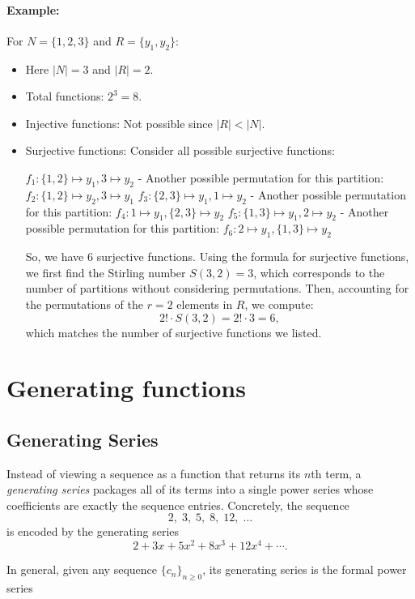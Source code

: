 \documentclass{article}
\begin{document}
\paragraph{Example:}  
For \( N = \{1, 2, 3\} \) and \( R = \{y_1, y_2\} \):
\begin{itemize}[nosep]
    \item[] Here \( |N| = 3 \) and \( |R| = 2 \).
    \item Total functions: $2^3 = 8$.
    \item Injective functions: Not possible since $|R|<|N|$.
    \item Surjective functions: Consider all possible surjective functions:

 \( f_1: \{1, 2\} \mapsto y_1, 3 \mapsto y_2 \)
- Another possible permutation for this partition: \( f_2: \{1, 2\} \mapsto y_2, 3 \mapsto y_1 \)
 \( f_3: \{2, 3\} \mapsto y_1, 1 \mapsto y_2 \)
- Another possible permutation for this partition: \( f_4: 1 \mapsto y_1, \{2, 3\} \mapsto y_2 \)
 \( f_5: \{1, 3\} \mapsto y_1, 2 \mapsto y_2 \)
- Another possible permutation for this partition: \( f_6: 2 \mapsto y_1, \{1, 3\} \mapsto y_2 \)

So, we have 6 surjective functions. Using the formula for surjective functions, we first find the Stirling number \( S(3, 2) = 3 \), which corresponds to the number of partitions without considering permutations. Then, accounting for the permutations of the \( r = 2 \) elements in \( R \), we compute:
\[
2! \cdot S(3, 2) = 2! \cdot 3 = 6,
\]
which matches the number of surjective functions we listed.
\end{itemize}

\section{Generating functions}
\subsection*{Generating Series}

Instead of viewing a sequence as a function that returns its \(n\)th term, a \emph{generating series} packages all of its terms into a single power series whose coefficients are exactly the sequence entries.  Concretely, the sequence
\[
2,\;3,\;5,\;8,\;12,\;\dots
\]
is encoded by the generating series
\[
2 + 3x + 5x^2 + 8x^3 + 12x^4 + \cdots.
\]

In general, given any sequence \(\{c_n\}_{n\ge0}\), its generating series is the formal power series
\end{document}
